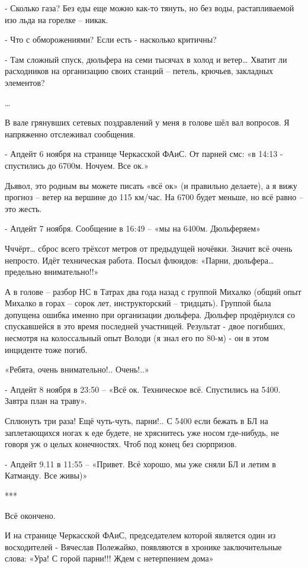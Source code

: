 - Сколько газа? Без еды еще можно как-то тянуть, но без воды, растапливаемой
изо льда на горелке – никак.

- Что с обморожениями? Если есть - насколько критичны?

- Там сложный спуск, дюльфера на семи тысячах в холод и ветер… Хватит ли
расходников на организацию своих станций – петель, крючьев, закладных
элементов?

…

В вале грянувших сетевых поздравлений у меня в голове шёл вал вопросов. Я
напряженно отслеживал сообщения.

- Апдейт 6 ноября на странице Черкасской ФАиС. От парней смс: «в 14:13 -
спустились до 6700м. Ночуем. Все ок.»

Дьявол, это родным вы можете писать «всё ок» (и правильно делаете), а я вижу
прогноз – ветер на вершине до 115 км/час. На 6700 будет меньше, но всё равно –
это жесть.

- Апдейт 7 ноября. Сообщение в 16:49 – «мы на 6400м. Дюльферяем»

Чччёрт… сброс всего трёхсот метров от предыдущей ночёвки. Значит всё очень
непросто. Идёт техническая работа. Посыл флюидов: «Парни, дюльфера… предельно
внимательно!!»

А в голове – разбор НС в Татрах два года назад с группой Михалко (общий опыт
Михалко в горах – сорок лет, инструкторский – тридцать). Группой была допущена
ошибка именно при организации дюльфера. Дюльфер продёрнулся со спускавшейся в
это время последней участницей. Результат - двое погибших, несмотря на
колоссальный опыт Володи (я знал его по 80-м) - он в этом инциденте тоже погиб.

«Ребята, очень внимательно!.. Очень!..»

- Апдейт 8 ноября в 23:50 – «Всё ок. Техническое всё. Спустились на 5400.
Завтра план на траву».

Сплюнуть три раза! Ещё чуть-чуть, парни!.. С 5400 если бежать в БЛ на
заплетающихся ногах к еде будете, не хряснитесь уже носом где-нибудь, не говоря
уж о целых конечностях. Чтоб под конец без сюрпризов. 

- Апдейт 9.11 в 11:55 – «Привет. Всё хорошо, мы уже сняли БЛ и летим в
Катманду. Все живы)»

***

Всё окончено.

И на странице Черкасской ФАиС, председателем которой является один из
восходителей - Вячеслав Полежайко, появляются в хронике заключительные слова:
«Ура! С горой парни!!! Ждем с нетерпением дома»

